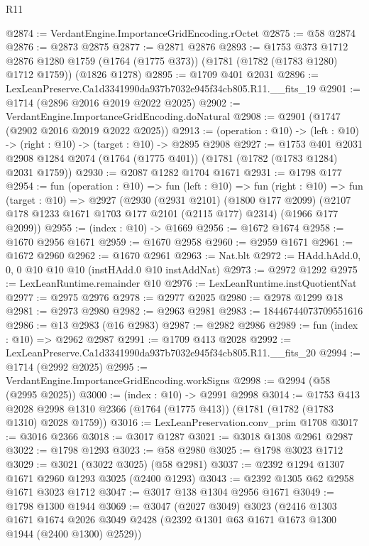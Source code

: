 \begin{lexlean}{R11}
\begin{coremodule}
@2874 := VerdantEngine.ImportanceGridEncoding.rOctet
@2875 := @58 @2874
@2876 := @2873 @2875
@2877 := @2871 @2876
@2893 := @1753
    @373
    @1712
    @2876
    @1280
    @1759
    (@1764 (@1775 @373))
    (@1781 (@1782 (@1783 @1280) @1712 @1759))
    (@1826 @1278)
@2895 := @1709 @401 @2031
@2896 := LexLeanPreserve.Ca1d3341990da937b7032e945f34cb805.R11.__fits_19
@2901 := @1714 (@2896 @2016 @2019 @2022 @2025)
@2902 := VerdantEngine.ImportanceGridEncoding.doNatural
@2908 := @2901 (@1747 (@2902 @2016 @2019 @2022 @2025))
@2913 := (operation : @10) -> (left : @10) -> (right : @10) -> (target : @10) -> @2895 @2908
@2927 := @1753
    @401
    @2031
    @2908
    @1284
    @2074
    (@1764 (@1775 @401))
    (@1781 (@1782 (@1783 @1284) @2031 @1759))
@2930 := @2087 @1282 @1704 @1671
@2931 := @1798 @177
@2954 := fun (operation : @10) =>
  fun (left : @10) =>
  fun (right : @10) =>
  fun (target : @10) =>
  @2927
    (@2930
      (@2931 @2101)
      (@1800 @177 @2099)
      (@2107 @178 @1233 @1671 @1703 @177 @2101 (@2115 @177) @2314)
      (@1966 @177 @2099))
@2955 := (index : @10) -> @1669
@2956 := @1672 @1674
@2958 := @1670 @2956 @1671
@2959 := @1670 @2958
@2960 := @2959 @1671
@2961 := @1672 @2960
@2962 := @1670 @2961
@2963 := Nat.blt
@2972 := HAdd.hAdd.{0, 0, 0} @10 @10 @10 (instHAdd.{0} @10 instAddNat)
@2973 := @2972 @1292
@2975 := LexLeanRuntime.remainder @10
@2976 := LexLeanRuntime.instQuotientNat
@2977 := @2975 @2976
@2978 := @2977 @2025
@2980 := @2978 @1299 @18
@2981 := @2973 @2980
@2982 := @2963 @2981
@2983 := 18446744073709551616
@2986 := @13 @2983 (@16 @2983)
@2987 := @2982 @2986
@2989 := fun (index : @10) => @2962 @2987
@2991 := @1709 @413 @2028
@2992 := LexLeanPreserve.Ca1d3341990da937b7032e945f34cb805.R11.__fits_20
@2994 := @1714 (@2992 @2025)
@2995 := VerdantEngine.ImportanceGridEncoding.workSigns
@2998 := @2994 (@58 (@2995 @2025))
@3000 := (index : @10) -> @2991 @2998
@3014 := @1753
    @413
    @2028
    @2998
    @1310
    @2366
    (@1764 (@1775 @413))
    (@1781 (@1782 (@1783 @1310) @2028 @1759))
@3016 := LexLeanPreservation.conv_prim @1708
@3017 := @3016 @2366
@3018 := @3017 @1287
@3021 := @3018 @1308 @2961 @2987
@3022 := @1798 @1293
@3023 := @58 @2980
@3025 := @1798 @3023 @1712
@3029 := @3021 (@3022 @3025) (@58 @2981)
@3037 := @2392 @1294 @1307 @1671 @2960 @1293 @3025 (@2400 @1293)
@3043 := @2392 @1305 @62 @2958 @1671 @3023 @1712
@3047 := @3017 @138 @1304 @2956 @1671
@3049 := @1798 @1300 @1944
@3069 := @3047
    (@2027 @3049)
    @3023
    (@2416
      @1303
      @1671
      @1674
      @2026
      @3049
      @2428
      (@2392 @1301 @63 @1671 @1673 @1300 @1944 (@2400 @1300) @2529))

\end{coremodule}
\end{lexlean}
